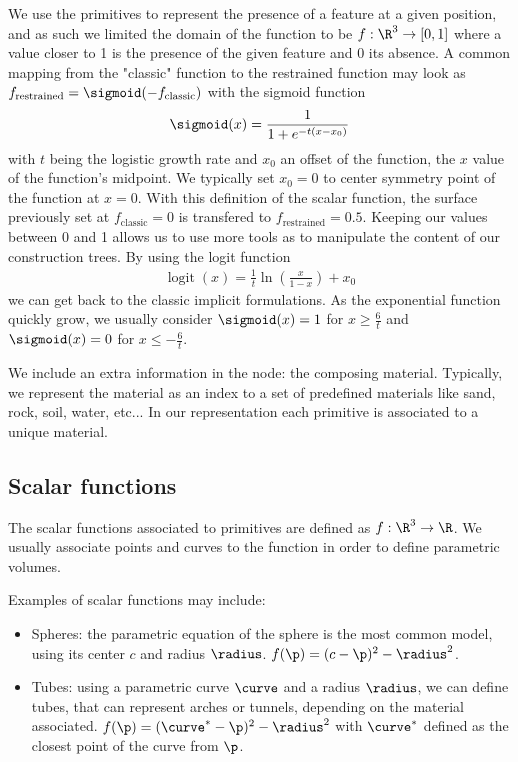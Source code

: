 We use the primitives to represent the presence of a feature at a given position, and as such we limited the domain of the function to be $f: \R^3 \to [0, 1]$ where a value closer to 1 is the presence of the given feature and 0 its absence. A common mapping from the "classic" function to the restrained function may look as $f_{\text{restrained}} = \sigmoid (- f_{\text{classic}})$ with the sigmoid function 
\begin{align}
    \sigmoid(x) = \frac{1}{1+e^{-t(x - x_0)}}
\end{align}    
with $t$ being the logistic growth rate and $x_0$ an offset of the function, the $x$ value of the function's midpoint. We typically set $x_0 = 0$ to center symmetry point of the function at $x = 0$. With this definition of the scalar function, the surface previously set at $f_{\text{classic}} = 0$ is transfered to $f_{\text{restrained}} = 0.5$. Keeping our values between 0 and 1 allows us to use more tools as to manipulate the content of our construction trees. By using the logit function 
\begin{align}
    \operatorname{logit}(x)=\frac{1}{t}\ln\left(\frac{x}{1-x}\right)+x_0
\end{align}
we can get back to the classic implicit formulations. As the exponential function quickly grow, we usually consider $\sigmoid(x)=1$ for $x \geq \frac{6}{t}$ and $\sigmoid(x)=0$ for $x \leq -\frac{6}{t}$.

We include an extra information in the node: the composing material. Typically, we represent the material as an index to a set of predefined materials like sand, rock, soil, water, etc... In our representation each primitive is associated to a unique material. 

\subsection{Scalar functions}
The scalar functions associated to primitives are defined as $f: \R^3 \to \R$. We usually associate points and curves to the function in order to define parametric volumes.

Examples of scalar functions may include:
\begin{itemize}
    \item Spheres: the parametric equation of the sphere is the most common model, using its center $c$ and radius $\radius$. $f(\p) = (c - \p)^2 - \radius^2$.
    \item Tubes: using a parametric curve $\curve$ and a radius $\radius$, we can define tubes, that can represent arches or tunnels, depending on the material associated. $f(\p) = (\curve^* - \p)^2 - \radius^2$ with $\curve^*$ defined as the closest point of the curve from $\p$.
\end{itemize}

